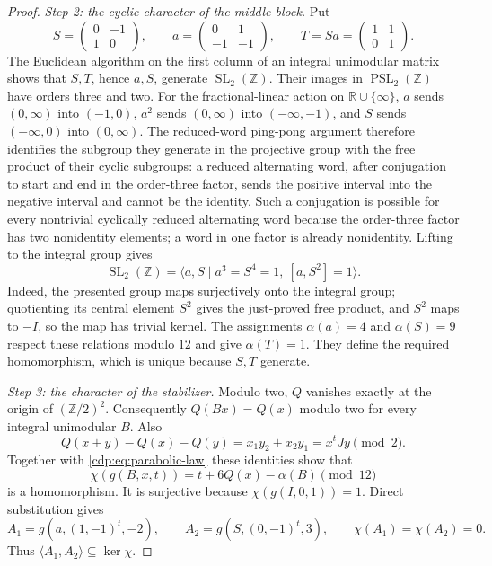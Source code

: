\begin{proof}
\textit{Step 2: the cyclic character of the middle block.}
Put
\[
 S=\begin{pmatrix}0&-1\\1&0\end{pmatrix},\qquad
 a=\begin{pmatrix}0&1\\-1&-1\end{pmatrix},\qquad
 T=Sa=\begin{pmatrix}1&1\\0&1\end{pmatrix}.
\]
The Euclidean algorithm on the first column of an integral
unimodular matrix shows that $S,T$, hence $a,S$, generate
$\operatorname{SL}_2(\mathbb Z)$. Their images in
$\operatorname{PSL}_2(\mathbb Z)$ have orders three and two.
For the fractional-linear action on $\mathbb R\cup\{\infty\}$,
$a$ sends $(0,\infty)$ into $(-1,0)$, $a^2$ sends
$(0,\infty)$ into $(-\infty,-1)$, and $S$ sends
$(-\infty,0)$ into $(0,\infty)$. The reduced-word ping-pong argument
therefore identifies the subgroup they generate in the projective
group with the free product of their cyclic subgroups: a reduced
alternating word, after conjugation to start and end in the
order-three factor, sends the positive interval into the negative
interval and cannot be the identity. Such a conjugation is possible
for every nontrivial cyclically reduced alternating word because
the order-three factor has two nonidentity elements; a word in one
factor is already nonidentity. Lifting to the integral group gives
\[
 \operatorname{SL}_2(\mathbb Z)
 =\langle a,S\mid a^3=S^4=1,\ [a,S^2]=1\rangle.
\]
Indeed, the presented group maps surjectively onto the integral
group; quotienting its central element $S^2$ gives the just-proved
free product, and $S^2$ maps to $-I$, so the map has trivial kernel.
The assignments $\alpha(a)=4$ and $\alpha(S)=9$ respect these
relations modulo $12$ and give $\alpha(T)=1$. They define the
required homomorphism, which is unique because $S,T$ generate.

\textit{Step 3: the character of the stabilizer.}
Modulo two, $Q$ vanishes exactly at the origin of $(\mathbb Z/2)^2$.
Consequently $Q(Bx)=Q(x)$ modulo two for every integral unimodular
$B$. Also
\[
 Q(x+y)-Q(x)-Q(y)=x_1y_2+x_2y_1=x^tJy\pmod2.
\]
Together with \eqref{cdp:eq:parabolic-law} these identities show that
\[
 \chi(g(B,x,t))=t+6Q(x)-\alpha(B)\pmod {12}
\]
is a homomorphism. It is surjective because
$\chi(g(I,0,1))=1$. Direct substitution gives
\[
 A_1=g(a,(1,-1)^t,-2),\qquad A_2=g(S,(0,-1)^t,3),
 \qquad \chi(A_1)=\chi(A_2)=0.
\]
Thus $\langle A_1,A_2\rangle\subseteq\ker\chi$.


\end{proof}
